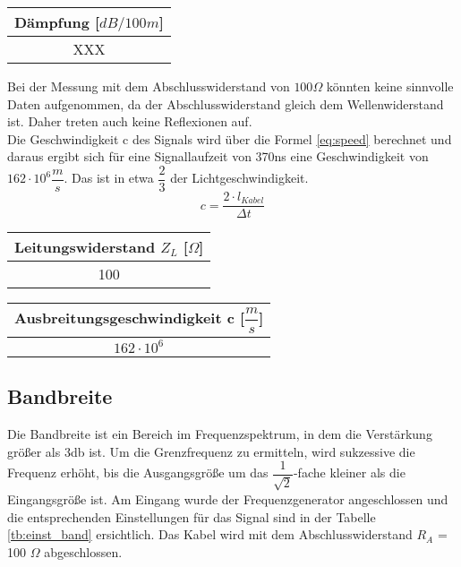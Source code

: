 \begin{table}[!h]
	\centering
	\begin{tabular}{|c|}
		\hline 
		Dämpfung [$dB / 100m$]		\\ 
		\hline 
		XXX	\\ 
		\hline 
	\end{tabular}
\end{table}

Bei der Messung mit dem Abschlusswiderstand von $100 \Omega$ könnten keine sinnvolle Daten aufgenommen, da der Abschlusswiderstand gleich dem Wellenwiderstand ist. Daher treten auch keine Reflexionen auf.
~\\
Die Geschwindigkeit c des Signals wird über die Formel \ref{eq:speed} berechnet und daraus ergibt sich für eine Signallaufzeit von 370ns eine Geschwindigkeit von $162\cdot 10^{6} \dfrac{m}{s}$. Das ist in etwa $\dfrac{2}{3}$ der Lichtgeschwindigkeit.
\begin{equation}
	c = \dfrac{2 \cdot l_{Kabel}}{\Delta t}
	\label{eq:speed}
\end{equation}

\begin{table}[!h]
	\centering
	\begin{tabular}{|c|}
		\hline 
		Leitungswiderstand $Z_L$ [$\Omega$]		\\ 
		\hline 
		100	\\ 
		\hline 
	\end{tabular}
\end{table}
\begin{table}[!h]
	\centering
	\begin{tabular}{|c|}
		\hline 
		Ausbreitungsgeschwindigkeit c [$\dfrac{m}{s}$]		\\ 
		\hline 
		$162\cdot 10^{6}$		\\ 
		\hline 
	\end{tabular}
\end{table}


\subsection{Bandbreite}

Die Bandbreite ist ein Bereich im Frequenzspektrum, in dem die Verstärkung größer als 3db ist. Um die Grenzfrequenz zu ermitteln, wird sukzessive die Frequenz erhöht, bis die Ausgangsgröße um das $\dfrac{1}{\sqrt{2}}$-fache kleiner als die Eingangsgröße ist. Am Eingang wurde der Frequenzgenerator angeschlossen und die entsprechenden Einstellungen für das Signal sind in der Tabelle \ref{tb:einst_band} ersichtlich. Das Kabel wird mit dem Abschlusswiderstand $R_A$ = 100 $\Omega$ abgeschlossen.

